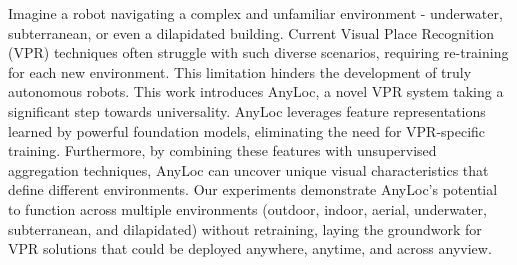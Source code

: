 
Imagine a robot navigating a complex and unfamiliar environment -
underwater, subterranean, or even a dilapidated building.  Current
Visual Place Recognition (VPR) techniques often struggle with such
diverse scenarios, requiring re-training for each new environment.
This limitation hinders the development of truly autonomous robots.
This work introduces AnyLoc, a novel VPR system taking a significant
step towards universality.  AnyLoc leverages feature representations
learned by powerful foundation models, eliminating the need for
VPR-specific training.  Furthermore, by combining these features with
unsupervised aggregation techniques, AnyLoc can uncover unique visual
characteristics that define different environments.  Our experiments
demonstrate AnyLoc's potential to function across multiple
environments (outdoor, indoor, aerial, underwater, subterranean, and
dilapidated) without retraining, laying the groundwork for VPR
solutions that could be deployed anywhere, anytime, and across
anyview.
